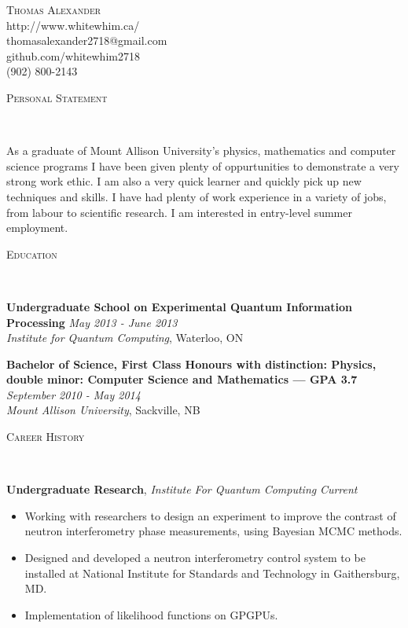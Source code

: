 \documentclass[9pt]{article}
\newenvironment{changemargin}[2]{%
  \begin{list}{}{%
    \setlength{\topsep}{0pt}%
    \setlength{\leftmargin}{#1}%
    \setlength{\rightmargin}{#2}%
    \setlength{\listparindent}{\parindent}%
    \setlength{\itemindent}{\parindent}%
    \setlength{\parsep}{\parskip}%
  }%
  \item[]}{\end{list}
}
\newcommand{\lineover}{
	\begin{changemargin}{-0.05in}{-0.05in}
		\vspace*{-8pt}
		\hrulefill \\
		\vspace*{-2pt}
	\end{changemargin}
}
\newcommand{\header}[1]{
	\begin{changemargin}{-0.5in}{-0.5in}
		\scshape{#1}\\
  	\lineover
	\end{changemargin}
}
\newcommand{\contact}[5]{
	\begin{changemargin}{-0.5in}{-0.5in}
		\begin{center}
			{\Large \scshape {#1}}\\ \smallskip
			{#2}\\ \smallskip 
			{#3}\\ \smallskip
			{#5}\\ \smallskip
			{#4}\smallskip
		\end{center}
	\end{changemargin}
}
\newenvironment{body} {
	\vspace*{-16pt}
	\begin{changemargin}{-0.25in}{-0.5in}
  }	
	{\end{changemargin}
}
\begin{document}
\contact{Thomas Alexander}{http://www.whitewhim.ca/}{thomasalexander2718@gmail.com}{(902) 800-2143}{github.com/whitewhim2718}


\header{Personal Statement}

\begin{body}
	\vspace{14pt}
	As a graduate of Mount Allison University's physics, mathematics and computer science programs I have been given plenty of oppurtunities to demonstrate a very strong work ethic. I am also a very quick learner and quickly pick up new techniques and skills. I have had plenty of work experience in a variety of jobs, from labour to scientific research. I am interested in entry-level summer employment. 

\smallskip


\header{Education}
\begin{body}
	\vspace{14pt}
	\textbf{Undergraduate School on Experimental Quantum Information Processing}{} \hfill \emph{May 2013 - June 2013}{} \\
	\emph{Institute for Quantum Computing}, Waterloo, ON{} \\
  
\end{body}
\begin{body}
	\vspace{14pt}
	\textbf{Bachelor of Science, First Class Honours with distinction: Physics, double minor: Computer Science and Mathematics — GPA 3.7 }{} \hfill \emph{September 2010 - May 2014}{} \\
	\emph{Mount Allison University}, Sackville, NB{} \\
  
\end{body}

\smallskip


\header{Career History}

\begin{body}
	\vspace{14pt}
	\textbf{Undergraduate Research}, \emph{Institute For Quantum Computing} \hfill \emph{Current}\\
	\vspace*{-4pt}
	\begin{itemize} \itemsep -0pt  %
		\item Working with researchers to design an experiment to improve the contrast of neutron interferometry phase measurements, using Bayesian MCMC methods.  
		\item Designed and developed a neutron interferometry control system to be installed at National Institute for Standards and Technology in Gaithersburg, MD.
		\item Implementation of likelihood functions on GPGPUs. 


\end{itemize}
\end{body}
\end{body}
\end{document}
